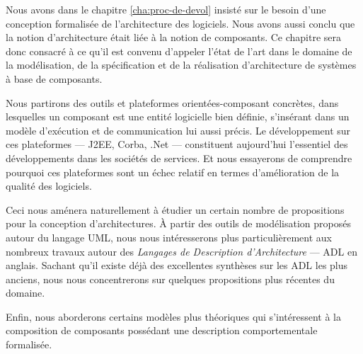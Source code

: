 

Nous avons dans le chapitre \ref{cha:proc-de-devol} insist\'e sur le
besoin d'une conception formalis\'ee de l'architecture des
logiciels. Nous avons aussi conclu que la notion d'architecture
\'etait li\'ee \`a la notion de composants. Ce chapitre sera donc
consacr\'e \`a ce qu'il est convenu d'appeler
l'\'etat de l'art dans le domaine de la mod\'elisation, de la
sp\'ecification et de la r\'ealisation d'architecture de syst\`emes
\`a base de composants.

Nous partirons des outils et plateformes orient\'ees-composant
concr\`etes, dans lesquelles un composant est une entit\'e
logicielle bien d\'efinie, s'ins\'erant dans un mod\`ele
d'ex\'ecution et de communication lui aussi pr\'ecis. Le
d\'eveloppement sur ces plateformes --- \textsf{J2EE},
\textsf{Corba}, \textsf{.Net} ---  constituent aujourd'hui l'essentiel
des d\'eveloppements dans les soci\'et\'es de services. Et nous
essayerons de comprendre pourquoi ces plateformes sont un \'echec
relatif en termes d'am\'elioration de la qualit\'e des logiciels. 

Ceci nous am\'enera naturellement \`a \'etudier un certain nombre
de propositions pour la conception d'architectures. \`A partir des
outils de mod\'elisation propos\'es autour du langage \textsf{UML},
nous nous int\'eresserons plus particuli\`erement aux nombreux travaux autour des \emph{Langages de
  Description d'Architecture} --- \textsf{ADL} en anglais. Sachant
qu'il existe d\'ej\`a des excellentes synth\`eses sur les ADL les
plus anciens, nous nous concentrerons sur quelques propositions plus 
r\'ecentes du domaine.

Enfin, nous aborderons certains mod\`eles plus th\'eoriques qui
s'int\'eressent \`a la composition de composants poss\'edant une
description comportementale formalis\'ee. 

